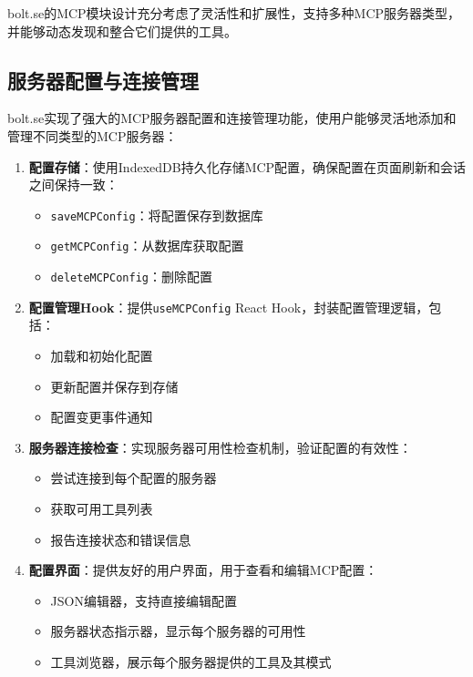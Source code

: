 bolt.se的MCP模块设计充分考虑了灵活性和扩展性，支持多种MCP服务器类型，并能够动态发现和整合它们提供的工具。

\subsection{服务器配置与连接管理}
bolt.se实现了强大的MCP服务器配置和连接管理功能，使用户能够灵活地添加和管理不同类型的MCP服务器：

\begin{enumerate}
  \item \textbf{配置存储}：使用IndexedDB持久化存储MCP配置，确保配置在页面刷新和会话之间保持一致：
    \begin{itemize}
      \item \texttt{saveMCPConfig}：将配置保存到数据库
      \item \texttt{getMCPConfig}：从数据库获取配置
      \item \texttt{deleteMCPConfig}：删除配置
    \end{itemize}
  
  \item \textbf{配置管理Hook}：提供\texttt{useMCPConfig} React Hook，封装配置管理逻辑，包括：
    \begin{itemize}
      \item 加载和初始化配置
      \item 更新配置并保存到存储
      \item 配置变更事件通知
    \end{itemize}
  
  \item \textbf{服务器连接检查}：实现服务器可用性检查机制，验证配置的有效性：
    \begin{itemize}
      \item 尝试连接到每个配置的服务器
      \item 获取可用工具列表
      \item 报告连接状态和错误信息
    \end{itemize}
  
  \item \textbf{配置界面}：提供友好的用户界面，用于查看和编辑MCP配置：
    \begin{itemize}
      \item JSON编辑器，支持直接编辑配置
      \item 服务器状态指示器，显示每个服务器的可用性
      \item 工具浏览器，展示每个服务器提供的工具及其模式
    \end{itemize}
\end{enumerate}

